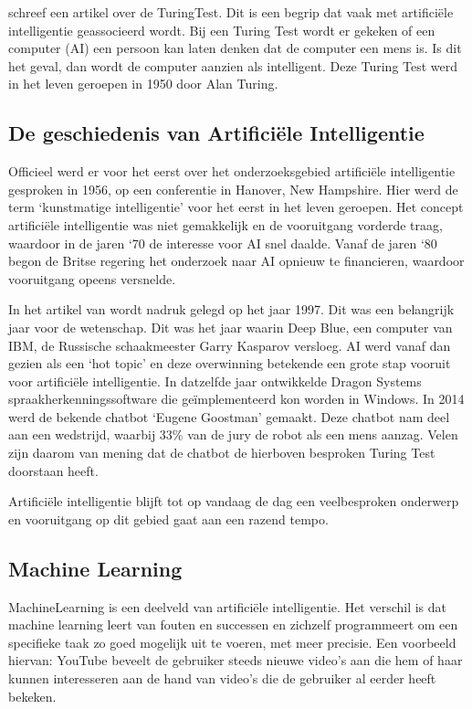 \textcite{Kraaijvanger2012} schreef een artikel over de \gls{TuringTest}. Dit is een begrip dat vaak met artificiële intelligentie geassocieerd wordt. Bij een Turing Test wordt er gekeken of een computer (AI) een persoon kan laten denken dat de computer een mens is. Is dit het geval, dan wordt de computer aanzien als intelligent. Deze Turing Test werd in het leven geroepen in 1950 door Alan Turing. 

\subsection{De geschiedenis van Artificiële Intelligentie}
\label{sec:artificiëleintelligentiegeschiedenis}

Officieel werd er voor het eerst over het onderzoeksgebied artificiële intelligentie gesproken in 1956, op een conferentie in Hanover, New Hampshire. Hier werd de term ‘kunstmatige intelligentie’ voor het eerst in het leven geroepen. Het concept artificiële intelligentie was niet gemakkelijk en de vooruitgang vorderde traag, waardoor in de jaren ‘70 de interesse voor AI snel daalde. Vanaf de jaren ‘80 begon de Britse regering het onderzoek naar AI opnieuw te financieren, waardoor vooruitgang opeens versnelde. \autocite{Anyoha2017}

In het artikel van \textcite{Anyoha2017} wordt nadruk gelegd op het jaar 1997. Dit was een belangrijk jaar voor de wetenschap. Dit was het jaar waarin Deep Blue, een computer van IBM, de Russische schaakmeester Garry Kasparov versloeg. AI werd vanaf dan gezien als een ‘hot topic’ en deze overwinning betekende een grote stap vooruit voor artificiële intelligentie. In datzelfde jaar ontwikkelde Dragon Systems spraakherkenningssoftware die geïmplementeerd kon worden in Windows. 
In 2014 werd de bekende chatbot ‘Eugene Goostman’ gemaakt. Deze chatbot nam deel aan een wedstrijd, waarbij 33\% van de jury de robot als een mens aanzag. Velen zijn daarom van mening dat de chatbot de hierboven besproken Turing Test doorstaan heeft. \autocite{Anyoha2017}
 
Artificiële intelligentie blijft tot op vandaag de dag een veelbesproken onderwerp en vooruitgang op dit gebied gaat aan een razend tempo. 

\subsection{Machine Learning}
\label{sec:machinelearning}
\gls{MachineLearning} is een deelveld van artificiële intelligentie. Het verschil is dat machine learning leert van fouten en successen en zichzelf programmeert om een specifieke taak zo goed mogelijk uit te voeren, met meer precisie. Een voorbeeld hiervan: YouTube beveelt de gebruiker steeds nieuwe video's aan die hem of haar kunnen interesseren aan de hand van video's die de gebruiker al eerder heeft bekeken. \autocite{IBM2021}

